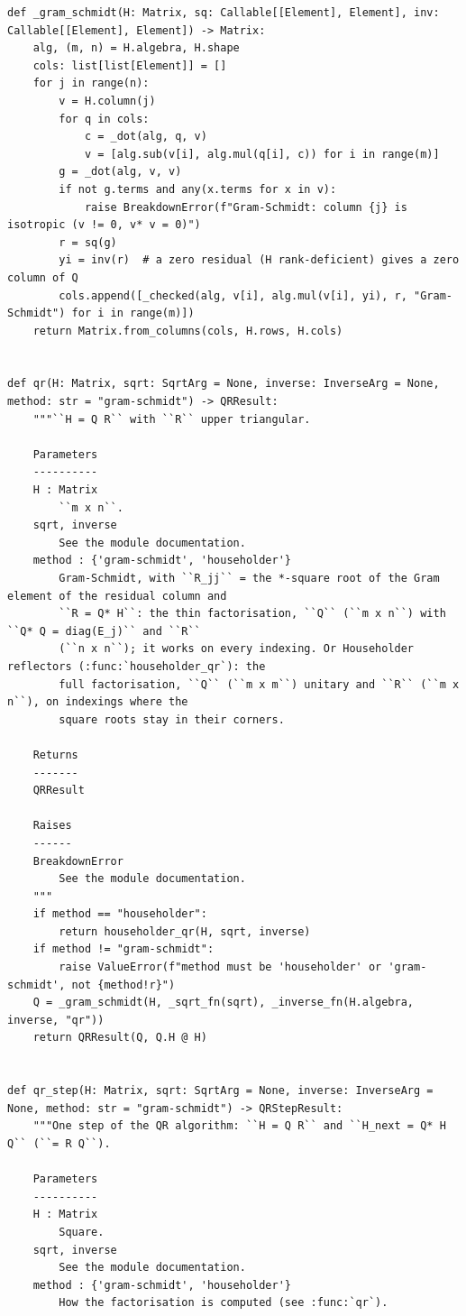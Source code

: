 \documentclass[12pt, a4paper]{report}
\theoremstyle{plain}
\theoremstyle{definition}
\theoremstyle{remark}
\theoremstyle{plain}
\begin{document}
\begin{lstlisting}[style=dsqcode]
def _gram_schmidt(H: Matrix, sq: Callable[[Element], Element], inv: Callable[[Element], Element]) -> Matrix:
    alg, (m, n) = H.algebra, H.shape
    cols: list[list[Element]] = []
    for j in range(n):
        v = H.column(j)
        for q in cols:
            c = _dot(alg, q, v)
            v = [alg.sub(v[i], alg.mul(q[i], c)) for i in range(m)]
        g = _dot(alg, v, v)
        if not g.terms and any(x.terms for x in v):
            raise BreakdownError(f"Gram-Schmidt: column {j} is isotropic (v != 0, v* v = 0)")
        r = sq(g)
        yi = inv(r)  # a zero residual (H rank-deficient) gives a zero column of Q
        cols.append([_checked(alg, v[i], alg.mul(v[i], yi), r, "Gram-Schmidt") for i in range(m)])
    return Matrix.from_columns(cols, H.rows, H.cols)


def qr(H: Matrix, sqrt: SqrtArg = None, inverse: InverseArg = None, method: str = "gram-schmidt") -> QRResult:
    """``H = Q R`` with ``R`` upper triangular.

    Parameters
    ----------
    H : Matrix
        ``m x n``.
    sqrt, inverse
        See the module documentation.
    method : {'gram-schmidt', 'householder'}
        Gram-Schmidt, with ``R_jj`` = the *-square root of the Gram element of the residual column and
        ``R = Q* H``: the thin factorisation, ``Q`` (``m x n``) with ``Q* Q = diag(E_j)`` and ``R``
        (``n x n``); it works on every indexing. Or Householder reflectors (:func:`householder_qr`): the
        full factorisation, ``Q`` (``m x m``) unitary and ``R`` (``m x n``), on indexings where the
        square roots stay in their corners.

    Returns
    -------
    QRResult

    Raises
    ------
    BreakdownError
        See the module documentation.
    """
    if method == "householder":
        return householder_qr(H, sqrt, inverse)
    if method != "gram-schmidt":
        raise ValueError(f"method must be 'householder' or 'gram-schmidt', not {method!r}")
    Q = _gram_schmidt(H, _sqrt_fn(sqrt), _inverse_fn(H.algebra, inverse, "qr"))
    return QRResult(Q, Q.H @ H)


def qr_step(H: Matrix, sqrt: SqrtArg = None, inverse: InverseArg = None, method: str = "gram-schmidt") -> QRStepResult:
    """One step of the QR algorithm: ``H = Q R`` and ``H_next = Q* H Q`` (``= R Q``).

    Parameters
    ----------
    H : Matrix
        Square.
    sqrt, inverse
        See the module documentation.
    method : {'gram-schmidt', 'householder'}
        How the factorisation is computed (see :func:`qr`).


\end{lstlisting}
\end{document}
